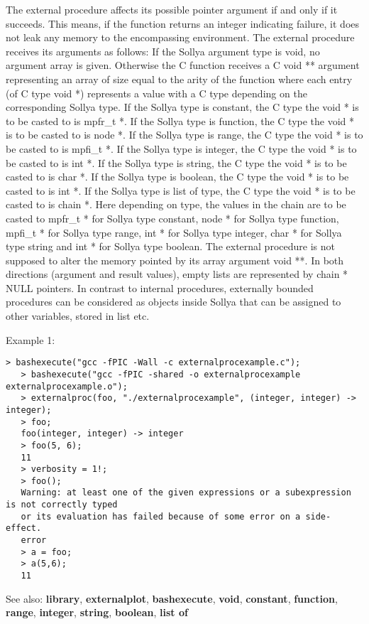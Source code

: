 \begin{itemize}
   The external procedure affects its possible pointer argument if and
   only if it succeeds.  This means, if the function returns an integer
   indicating failure, it does not leak any memory to the encompassing
   environment.
   The external procedure receives its arguments as follows: If the
   Sollya argument type is void, no argument array is given.  Otherwise
   the C function receives a C void ** argument representing an array of
   size equal to the arity of the function where each entry (of C type
   void *) represents a value with a C type depending on the
   corresponding Sollya type. If the Sollya type is constant, the C
   type the void * is to be casted to is mpfr\_t *.  If the Sollya type
   is function, the C type the void * is to be casted to is node *.  If
   the Sollya type is range, the C type the void * is to be casted to is
   mpfi\_t *.  If the Sollya type is integer, the C type the void * is to
   be casted to is int *.  If the Sollya type is string, the C type the
   void * is to be casted to is char *.  If the Sollya type is boolean,
   the C type the void * is to be casted to is int *.  If the Sollya
   type is list of type, the C type the void * is to be casted to is
   chain *.  Here depending on type, the values in the chain are to be
   casted to mpfr\_t * for Sollya type constant, node * for Sollya type
   function, mpfi\_t * for Sollya type range, int * for Sollya type
   integer, char * for Sollya type string and int * for Sollya type
   boolean.
   The external procedure is not supposed to alter the memory pointed by
   its array argument void **.
   In both directions (argument and result values), empty lists are
   represented by chain * NULL pointers.
   In contrast to internal procedures, externally bounded procedures can
   be considered as objects inside Sollya that can be assigned to other
   variables, stored in list etc.
\end{itemize}
\noindent Example 1: 
\begin{center}\begin{minipage}{14.8cm}\begin{Verbatim}[frame=single]
   > bashexecute("gcc -fPIC -Wall -c externalprocexample.c");
   > bashexecute("gcc -fPIC -shared -o externalprocexample externalprocexample.o");
   > externalproc(foo, "./externalprocexample", (integer, integer) -> integer);
   > foo;
   foo(integer, integer) -> integer
   > foo(5, 6);
   11
   > verbosity = 1!;
   > foo();
   Warning: at least one of the given expressions or a subexpression is not correctly typed
   or its evaluation has failed because of some error on a side-effect.
   error
   > a = foo;
   > a(5,6);
   11
\end{Verbatim}
\end{minipage}\end{center}
See also: \textbf{library}, \textbf{externalplot}, \textbf{bashexecute}, \textbf{void}, \textbf{constant}, \textbf{function}, \textbf{range}, \textbf{integer}, \textbf{string}, \textbf{boolean}, \textbf{list of}
